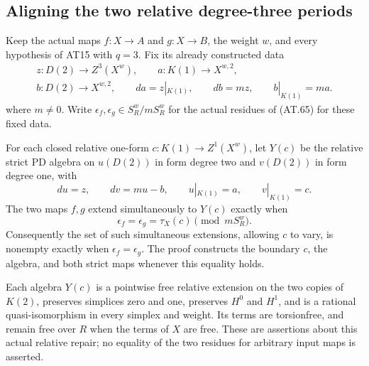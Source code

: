 \subsection{Aligning the two relative degree-three periods}

\begin{proposition}
\label{AL13}
Keep the actual maps $f:X\to A$ and $g:X\to B$, the weight
$w$, and every hypothesis of AT15 with $q=3$.
Fix its already constructed data
\[
 \begin{gathered}
 z:D(2)\longrightarrow Z^3(X^w),\qquad
 a:K(1)\longrightarrow X^{w,2},\\
 b:D(2)\longrightarrow X^{w,2},\qquad
 da=z|_{K(1)},\qquad db=mz,\qquad b|_{K(1)}=ma.
 \end{gathered}
 \tag{AL.71}
\]
where $m\ne0$.
Write $\epsilon_f,\epsilon_g\in S_R^w/mS_R^w$ for the
actual residues of \textup{(AT.65)} for these fixed data.

For each closed relative one-form
$c:K(1)\to Z^1(X^w)$, let $Y(c)$ be the relative strict
PD algebra on $u(D(2))$ in form degree two and $v(D(2))$
in form degree one, with
\[
 du=z,\qquad dv=mu-b,\qquad
 u|_{K(1)}=a,\qquad v|_{K(1)}=c.
 \tag{AL.72}
\]
The two maps $f,g$ extend simultaneously to $Y(c)$ exactly when
\[
 \epsilon_f=\epsilon_g=\tau_X(c)\pmod {mS_R^w}.
 \tag{AL.73}
\]
Consequently the set of such simultaneous extensions, allowing
$c$ to vary, is nonempty exactly when $\epsilon_f=\epsilon_g$.
The proof constructs the boundary $c$, the algebra, and both
strict maps whenever this equality holds.

Each algebra $Y(c)$ is a pointwise free relative extension on
the two copies of $K(2)$, preserves simplices zero and one,
preserves $H^0$ and $H^1$, and is a rational quasi-isomorphism
in every simplex and weight. Its terms are torsionfree, and
remain free over $R$ when the terms of $X$ are free.
These are assertions about this actual relative repair; no
equality of the two residues for arbitrary input maps is asserted.
\end{proposition}

